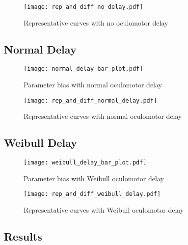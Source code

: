 \begin{figure}[H]
\centering
\texttt{[image: rep\_and\_diff\_no\_delay.pdf]}
\caption{Representative curves with no oculomotor delay}
\label{fig:rep_curves_no_delay}
\end{figure}


%
%
\subsection{Normal Delay}

\begin{figure}[H]
\centering
\texttt{[image: normal\_delay\_bar\_plot.pdf]}
\caption{Parameter bias with normal oculomotor delay}
\label{fig:par_bias_normal_delay}
\end{figure}

\begin{figure}[H]
\centering
\texttt{[image: rep\_and\_diff\_normal\_delay.pdf]}
\caption{Representative curves with normal oculomotor delay}
\label{fig:rep_curves_normal_delay}
\end{figure}

\subsection{Weibull Delay}



\begin{figure}[H]
\centering
\texttt{[image: weibull\_delay\_bar\_plot.pdf]}
\caption{Parameter bias with Weibull oculomotor delay}
\label{fig:par_bias_weibull_delay}
\end{figure}

\begin{figure}[H]
\centering
\texttt{[image: rep\_and\_diff\_weibull\_delay.pdf]}
\caption{Representative curves with Weibull oculomotor delay}
\label{fig:rep_curves_weibull_delay}
\end{figure}





\subsection{Results}

